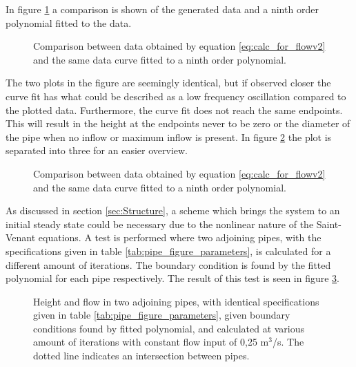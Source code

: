 In figure \ref{fig:curvefit_comparision} a comparison is shown of the generated data and a ninth order polynomial fitted to the data.

\begin{figure}[H]
 \centering
 
\caption{Comparison between data obtained by equation \ref{eq:calc_for_flowv2} and the same data curve fitted to a ninth order polynomial.}
\label{fig:curvefit_comparision}
\end{figure}
The two plots in the figure are seemingly identical, but if observed closer the curve fit has what could be described as a low frequency oscillation compared to the plotted data. Furthermore, the curve fit does not reach the same endpoints. This will result in the height at the endpoints never to be zero or the diameter of the pipe when no inflow or maximum inflow is present. In figure \ref{fig:curvefit_comparision_split} the plot is separated into three for an easier overview.


\begin{figure}[H]
 \centering
 
\caption{Comparison between data obtained by equation \ref{eq:calc_for_flowv2} and the same data curve fitted to a ninth order polynomial.}
\label{fig:curvefit_comparision_split}
\end{figure}


 As discussed in section \ref{sec:Structure}, a scheme which brings the system to an initial steady state could be necessary due to the nonlinear nature of the Saint-Venant equations. A test is performed where two adjoining pipes, with the specifications given in table \ref{tab:pipe_figure_parameters}, is calculated for a different amount of iterations. The boundary condition is found by the fitted polynomial for each pipe respectively. The result of this test is seen in figure \ref{fig:two_pipes_init_steady_state}. 

\begin{figure}[H]
 \centering
 
\caption{Height and flow in two adjoining pipes, with identical specifications given in table \ref{tab:pipe_figure_parameters}, given boundary conditions found by fitted polynomial, and calculated at various amount of iterations with constant flow input of 0,25 $\text{m}^\text{3}$/s. The dotted line indicates an intersection between pipes.}
\label{fig:two_pipes_init_steady_state}
\end{figure}

